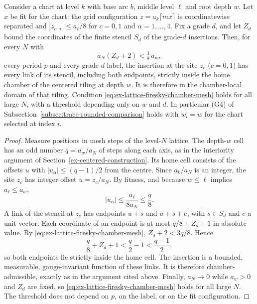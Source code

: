 \begin{lemma}
\label{lem:ex-lattice-firesky-chamber}
Consider a chart at level $k$ with base arc $b$, middle level $\ell$ and
root depth $w$. Let $x$ be fit for the chart: the grid configuration
$z=a_k\lceil mx\rceil$ is coordinatewise separated and
$|z_{c,\alpha}|\le a_\ell/8$ for $c=0,1$ and $\alpha=1,\dots,4$. Fix a grade
$d$, and let $Z_d$ bound the coordinates of the finite stencil $S_d$ of
the grade-$d$ insertions. Then, for every $N$ with
\begin{equation}\label{eq:ex-lattice-firesky-chamber-mesh}
 a_N(Z_d+2)<\tfrac38\,a_w ,
\end{equation}
every period $p$ and every grade-$d$ label, the insertion at the site
$z_c$ ($c=0,1$) has every link of its stencil, including both endpoints,
strictly inside the home chamber of the centered tiling at depth $w$. It
is therefore in the chamber-local domain of that tiling. Condition
\eqref{eq:ex-lattice-firesky-chamber-mesh} holds for all large $N$, with
a threshold depending only on $w$ and $d$. In particular (G4) of
Subsection~\ref{subsec:trace-rounded-comparison} holds with $w_i=w$ for
the chart selected at index $i$.
\end{lemma}
\begin{proof}
Measure positions in mesh steps of the level-$N$ lattice. The depth-$w$
cell has an odd number $q=a_w/a_N$ of steps along each axis, as in the
interiority argument of Section~\ref{ex-centered-construction}. Its home
cell consists of the offsets $u$ with $|u_\alpha|\le(q-1)/2$ from the
centre. Since $a_k/a_N$ is an integer, the site $z_c$ has integer
offset $u=z_c/a_N$. By fitness, and because $w\le\ell$ implies
$a_\ell\le a_w$,
\[
 |u_\alpha|\le\frac{a_\ell}{8a_N}\le\frac{q}{8}.
\]
A link of the stencil at $z_c$ has endpoints $u+s$ and $u+s+e$, with
$s\in S_d$ and $e$ a unit vector. Each coordinate of an endpoint is at
most $q/8+Z_d+1$ in absolute value. By
\eqref{eq:ex-lattice-firesky-chamber-mesh},
$Z_d+2<3q/8$. Hence
\[
 \frac q8+Z_d+1<\frac q2-1<\frac{q-1}2 ,
\]
so both endpoints lie strictly inside the home cell. The insertion is a
bounded, measurable, gauge-invariant function of these links. It is
therefore chamber-admissible, exactly as in the argument cited above.
Finally, $a_N\to0$ while $a_w>0$ and $Z_d$ are fixed, so
\eqref{eq:ex-lattice-firesky-chamber-mesh} holds for all large $N$. The
threshold does not depend on $p$, on the label, or on the fit
configuration.
\end{proof}

